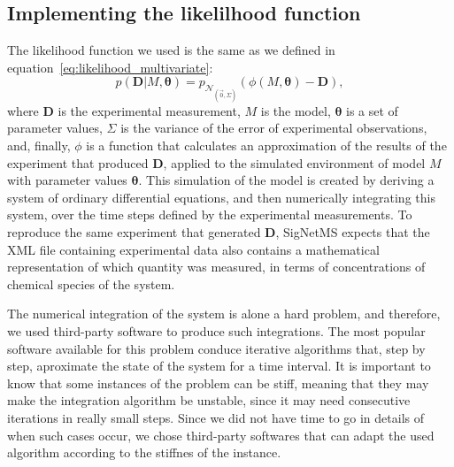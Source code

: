 
\subsection{Implementing the likelilhood function}
The likelihood function we used is the same as we defined in
equation~\ref{eq:likelihood_multivariate}:
\begin{equation*}
    p ({\bm D} | M,{\bm \theta}) = 
        p_{\mathcal{N}_{\left(\vec{0}, \Sigma\right)}}
        (\phi (M, {\bm\theta}) - {\bm D}),
\end{equation*}
where ${\bm D}$ is the experimental measurement, $M$ is the model,
${\bm \theta}$ is a set of parameter values, $\Sigma$ is the variance of
the error of experimental observations, and, finally, $\phi$ is a 
function that calculates an approximation of the results of the
experiment that produced ${\bm D}$, applied to the simulated environment
of model $M$ with parameter values ${\bm \theta}$. This simulation of
the model is created by deriving a system of ordinary differential
equations, and then numerically integrating this system, over the time
steps defined by the experimental measurements. To reproduce the same
experiment that generated ${\bm D}$, SigNetMS expects that the XML file 
containing experimental data also contains a mathematical representation
of which quantity was measured, in terms of concentrations of chemical
species of the system.

The numerical integration of the system is alone a hard problem, and
therefore, we used third-party software to produce such integrations.
The most popular software available for this problem conduce
iterative algorithms that, step by step, aproximate the state of the
system for a time interval. It is important to know that some instances
of the problem can be stiff, meaning that they may make the integration
algorithm be unstable, since it may need consecutive iterations in 
really small steps. Since we did not have time to go in details of when 
such cases occur, we chose third-party softwares that can adapt the used
algorithm according to the stiffnes of the instance.

